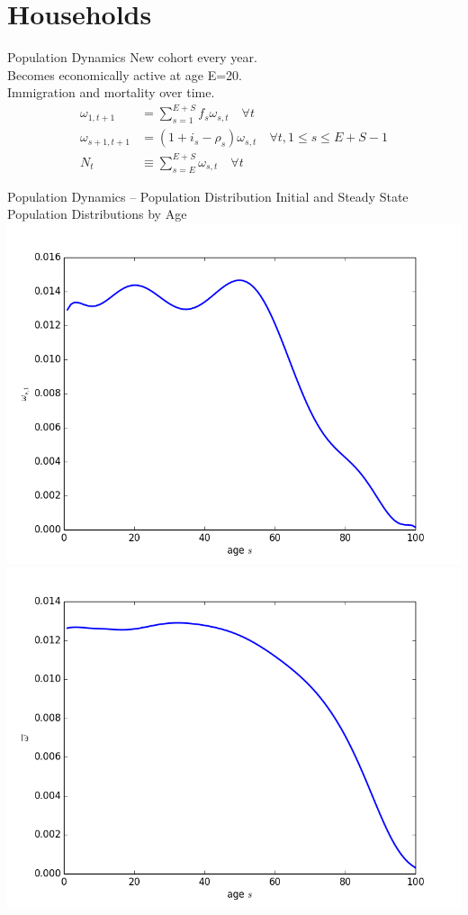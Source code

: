 \documentclass{beamer}
\begin{document}
\section{Households}
  \begin{frame}{Population Dynamics}\label{Population}
    New cohort every year. \\
    Becomes economically active at age E=20. \\
    Immigration and mortality over time.
    \begin{align}
      \omega_{1,t+1} &= \sum_{s=1}^{E+S} f_s\omega_{s,t}\quad\forall t \nonumber\\
      \omega_{s+1,t+1} &= (1 + i_s - \rho_s)\omega_{s,t}\quad\forall t, 1\leq s \leq E+S-1 \nonumber \\
      N_t & \equiv\sum_{s=E}^{E+S} \omega_{s,t} \quad\forall t \nonumber
    \end{align}
    \hyperlink{demographics}{}
  \end{frame}

  \begin{frame}{Population Dynamics -- Population Distribution}
  Initial and Steady State Population Distributions by Age
  \includegraphics[scale=.275]{images/omega_init.png}
  \includegraphics[scale=.275]{images/omega_ss.png}
  \end{frame}
\end{document}
